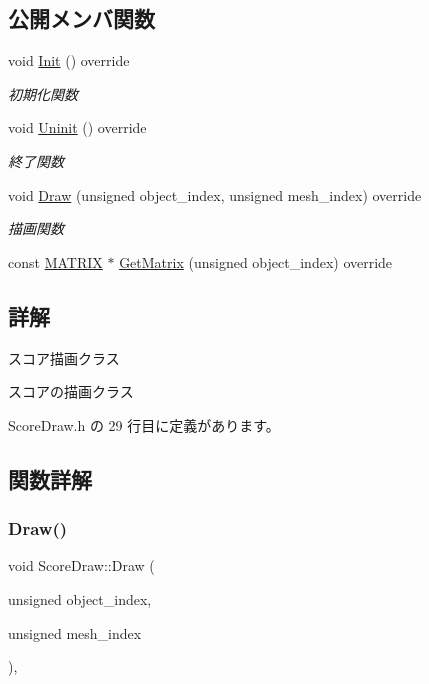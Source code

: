 \subsection*{公開メンバ関数}
\begin{DoxyCompactItemize}
\item 
void \mbox{\hyperlink{class_score_draw_af013abb96136825e71d4fee06529fc69}{Init}} () override
\begin{DoxyCompactList}\small\item\em 初期化関数 \end{DoxyCompactList}\item 
void \mbox{\hyperlink{class_score_draw_aad744f8a7a1202e6ba8117c660f297ee}{Uninit}} () override
\begin{DoxyCompactList}\small\item\em 終了関数 \end{DoxyCompactList}\item 
void \mbox{\hyperlink{class_score_draw_a799e71943140a264cedba6002308b976}{Draw}} (unsigned object\+\_\+index, unsigned mesh\+\_\+index) override
\begin{DoxyCompactList}\small\item\em 描画関数 \end{DoxyCompactList}\item 
const \mbox{\hyperlink{_vector3_d_8h_a032295cd9fb1b711757c90667278e744}{M\+A\+T\+R\+IX}} $\ast$ \mbox{\hyperlink{class_score_draw_a62aa20ef4b40544bf0a95770b925c780}{Get\+Matrix}} (unsigned object\+\_\+index) override
\end{DoxyCompactItemize}


\subsection{詳解}
スコア描画クラス 

スコアの描画クラス 

 Score\+Draw.\+h の 29 行目に定義があります。



\subsection{関数詳解}
\mbox{\label{class_score_draw_a799e71943140a264cedba6002308b976}} 
\subsubsection{\texorpdfstring{Draw()}{Draw()}}
{\footnotesize\ttfamily void Score\+Draw\+::\+Draw (\begin{DoxyParamCaption}\item[{unsigned}]{object\+\_\+index,  }\item[{unsigned}]{mesh\+\_\+index }\end{DoxyParamCaption})\hspace{0.3cm}{\ttfamily [override]}, {\ttfamily [virtual]}}




